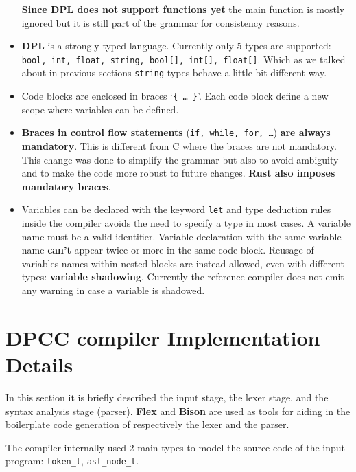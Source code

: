 \documentclass[a4paper]{article}
\begin{document}
\begin{itemize}
    \textbf{Since DPL does not support functions yet} the main function is mostly ignored but it is still
    part of the grammar for consistency reasons.
    \item \textbf{DPL} is a strongly typed language. Currently only 5 types are supported: \texttt{bool, int, float, string, bool[], int[], float[]}. Which
        as we talked about in previous sections \texttt{string} types behave a little bit different way.


    \item Code blocks are enclosed in braces `\texttt{\{ \dots \ \}}'. Each code block define a new scope where variables can
        be defined.
    \item \textbf{Braces in control flow statements} (\texttt{if, while, for, \dots}) \textbf{are always mandatory}. This is different from C where the braces are not mandatory. This change was done to simplify the grammar but also to avoid ambiguity and to make the code more robust to future changes.
        \textbf{Rust also imposes mandatory braces}.

    \item Variables can be declared with the keyword \texttt{let} and type deduction rules inside the compiler avoids the need to specify a type in most cases. A variable name must be a valid identifier. Variable declaration with the same variable name \textbf{can't} appear twice or more in the same code block. Reusage of variables names within nested blocks are instead allowed, even with different types: \textbf{variable shadowing}. Currently the reference compiler does not emit any warning in case a variable is shadowed.

\end{itemize}

\clearpage
\section{DPCC compiler Implementation Details}

In this section it is briefly described the input stage, the lexer stage, and the syntax analysis stage (parser).
\textbf{Flex} and \textbf{Bison} are used as tools for aiding in the boilerplate code generation of respectively the lexer and the parser.

The compiler internally used 2 main types to model the source code of the input program: \texttt{token\_t}, \texttt{ast\_node\_t}.
\end{document}
